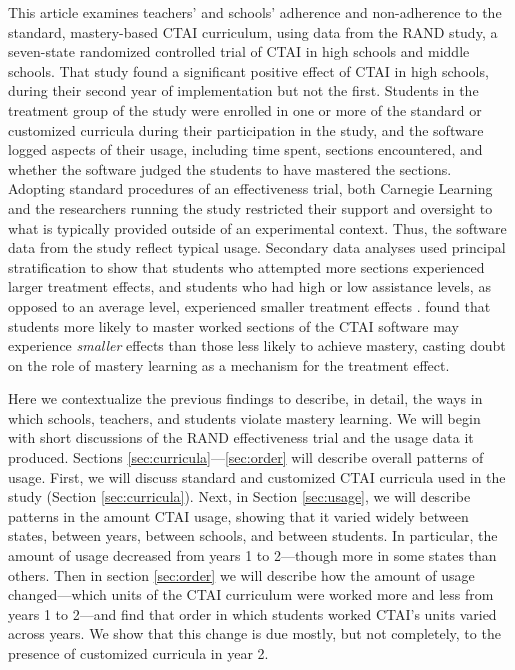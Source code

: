\documentclass[12pt]{article}\usepackage[]{graphicx}\usepackage[]{color}
\begin{document}
This article examines teachers' and schools' adherence and
non-adherence to the standard, mastery-based CTAI curriculum, using
data from the RAND study, a seven-state randomized controlled trial of
CTAI in high schools and middle schools. That study found a significant
positive effect of CTAI in high schools, during their second year of
implementation but not the first. Students in the treatment group of
the study were enrolled in one or more of the standard or customized
curricula during their participation in the study, and the software
logged aspects of their usage, including time spent, sections
encountered, and whether the software judged the students to have
mastered the sections. Adopting standard procedures of an
effectiveness trial, both Carnegie Learning and the researchers
running the study restricted their support and oversight to what is
typically provided outside of an experimental context. Thus, the
software data from the study reflect typical usage. Secondary data analyses used principal stratification to show that students who attempted more sections experienced larger treatment effects, and students who had high or low assistance levels, as opposed to an average level, experienced smaller treatment effects \citep{sales2015exploring,sales2016student}.
\citet{sales2017role} found that students more likely to master worked
sections of the CTAI software may experience \emph{smaller} effects
than those less likely to achieve mastery, casting doubt on the role
of mastery learning as a mechanism for the treatment effect.

Here we contextualize the previous findings to describe, in detail, the ways
in which schools, teachers, and students violate mastery learning.
We will begin with short discussions of the RAND effectiveness trial and the usage
data it produced.
Sections \ref{sec:curricula}---\ref{sec:order} will describe overall
patterns of usage.
First, we will discuss standard and customized CTAI curricula used in
the study (Section \ref{sec:curricula}).
Next, in Section \ref{sec:usage}, we will describe patterns in the amount CTAI usage, showing that
it varied widely between states, between years, between schools, and between students.
In particular, the amount of usage decreased from years 1 to
2---though more in some states than others.
Then in section \ref{sec:order} we will describe how the amount of usage
changed---which units of the CTAI curriculum were worked more and less
from years 1 to 2---and find that order in which students worked
CTAI's units varied across years. We show that this change is due
mostly, but not completely, to the presence of customized curricula in
year 2.
\end{document}
